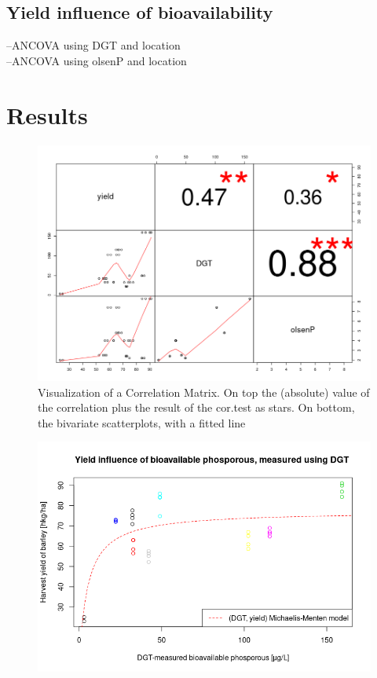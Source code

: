 \documentclass[12pt,fleqn]{article}
\begin{document}
\subsection{Yield influence of bioavailability}
--ANCOVA using DGT and location\\
--ANCOVA using olsenP and location
\section{Results}
\begin{figure}[H]
	\centering
	\includegraphics[width=.9\linewidth]{p2_corrplot}
	\caption{Visualization of a Correlation Matrix. On top the (absolute) value of the correlation plus the result of the cor.test as stars. On bottom, the bivariate scatterplots, with a fitted line}
\end{figure}
\begin{figure}[H]
	\centering
	\includegraphics[width=.8\linewidth]{dgt_mmm}
\end{figure}
\end{document}
